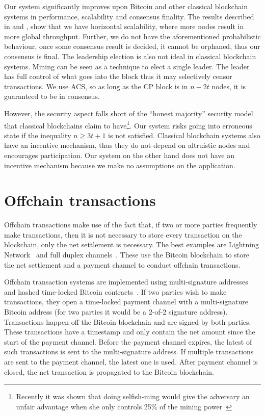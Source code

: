 Our system significantly improves upon Bitcoin and other classical blockchain systems in performance, scalability and consensus finality.
The results described in  and , show that we have horizontal scalability,
where more nodes result in more global throughput.
Further, we do not have the aforementioned probabilistic behaviour,
once some consensus result is decided, it cannot be orphaned, thus our consensus is final.
The leadership election is also not ideal in classical blockchain systems.
Mining can be seen as a technique to elect a single leader.
The leader has full control of what goes into the block thus it may selectively censor transactions.
We use ACS, so as long as the CP block is in $n - 2t$ nodes, it is guaranteed to be in consensus.

However, the security aspect falls short of the ``honest majority'' security model that classical blockchains claim to 
have\footnote{Recently it was shown that doing selfish-ming would give the adversary an unfair advantage when she only controls 25\% of the mining power~\cite{eyal2014majority}}.
Our system risks going into erroneous state if the inequality $n \ge 3t + 1$ is not satisfied.
Classical blockchain systems also have an incentive mechanism, thus they do not depend on altruistic nodes and encourages participation.
Our system on the other hand does not have an incentive mechanism because we make no assumptions on the application.

\section{Offchain transactions}
Offchain transactions make use of the fact that, if two or more parties frequently make transactions,
then it is not necessary to store every transaction on the blockchain, only the net settlement is necessary.
The best examples are Lightning Network~\cite{lightningnetwork} and full duplex channels~\cite{decker2015fast}.
These use the Bitcoin blockchain to store the net settlement and a payment channel to conduct offchain transactions.

Offchain transaction systems are implemented using multi-signature addresses~\cite{bitcoinmultisig} and hashed time-locked Bitcoin contracts~\cite{bitcointimelock}.
If two parties wish to make transactions, they open a time-locked payment channel with a multi-signature Bitcoin address (for two parties it would be a 2-of-2 signature address).
Transactions happen off the Bitcoin blockchain and are signed by both parties.
These transactions have a timestamp and only contain the net amount since the start of the payment channel.
Before the payment channel expires, the latest of such transactions is sent to the multi-signature address.
If multiple transactions are sent to the payment channel, the latest one is used.
After payment channel is closed, the net transaction is propagated to the Bitcoin blockchain.

